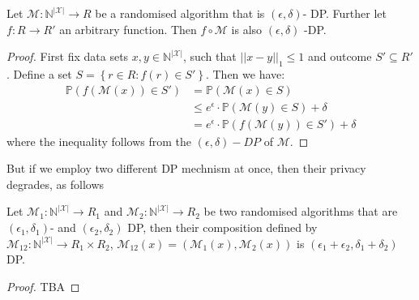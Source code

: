 \begin{thm} \label{thm:postpro}
    Let $\mathcal{M}: \mathbb{N}^{|\mathcal{X}|} \rightarrow R$ be a randomised algorithm that is $(\epsilon, \delta)$- DP. Further let $f: R \rightarrow R'$ an arbitrary function. Then $f \circ \mathcal{M}$ is also $(\epsilon, \delta)$ -DP.
\end{thm}
\begin{proof}
    First fix data sets $x,y \in \mathbb{N}^{|\mathcal{X}|}$, such that $||x-y||_1\le 1$ and outcome $S' \subseteq R'$. Define a set $S=\left\{r\in R: f(r) \in S'\right\}$. Then we have:
    \begin{align}
        \mathbb{P}(f(\mathcal{M}(x))\in S') &= \mathbb{P}(\mathcal{M}(x)\in S) \nonumber \\
        &\le e^\epsilon \cdot \mathbb{P}(\mathcal{M}(y)\in S) + \delta \nonumber \\
        &= e^\epsilon \cdot \mathbb{P}(f(\mathcal{M}(y))\in S') + \delta
    \end{align}
    where the inequality follows from the $(\epsilon, \delta)-DP$ of $\mathcal{M}$.
\end{proof}

But if we employ two different DP mechnism at once, then their privacy degrades, as follows

\begin{thm}
    Let $\mathcal{M}_1: \mathbb{N}^{|\mathcal{X}|} \rightarrow R_1$ and $\mathcal{M}_2: \mathbb{N}^{|\mathcal{X}|} \rightarrow R_2$ be two randomised algorithms that are $(\epsilon_1, \delta_1)$- and $(\epsilon_2, \delta_2)$ DP, then their composition defined by $\mathcal{M}_{12}: \mathbb{N}^{|\mathcal{X}|} \rightarrow R_1 \times R_2$, $\mathcal{M}_{12}(x)=(\mathcal{M}_{1}(x), \mathcal{M}_{2}(x))$ is $(\epsilon_1+\epsilon_2, \delta_1+\delta_2)$ DP.
\end{thm}
\begin{proof}
    TBA
\end{proof}

